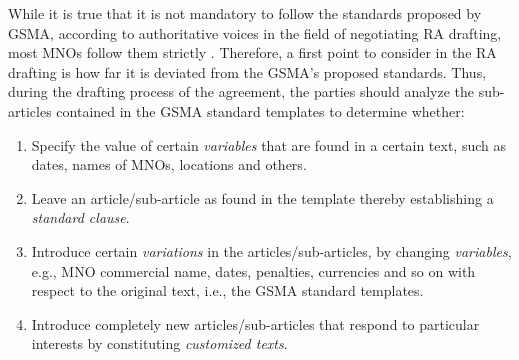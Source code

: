 \documentclass[conference]{style/IEEEtran}
\begin{document}
While it is true that it is not mandatory to follow the standards proposed by GSMA, according to authoritative voices in the field of negotiating RA drafting, most MNOs follow them strictly \cite{ROCCO2017a}. Therefore, a first point to consider in the RA drafting is how far it is deviated from the GSMA's proposed standards. Thus, during the drafting process of the agreement, the parties should analyze the sub-articles contained in the GSMA standard templates to determine whether:

\begin{enumerate}
\item Specify the value of certain \textit{variables} that are found in a certain text, such as dates, names of MNOs, locations and others.

\item Leave an article/sub-article as found in the template thereby establishing a \textit{standard clause}.

\item Introduce certain \textit{variations} in the articles/sub-articles, by changing \textit{variables}, e.g., MNO commercial name, dates, penalties, currencies and so on with respect to the original text, i.e., the GSMA standard templates.

\item Introduce completely new articles/sub-articles that respond to particular interests by constituting \textit{customized texts}.

\end{enumerate}
\end{document}
